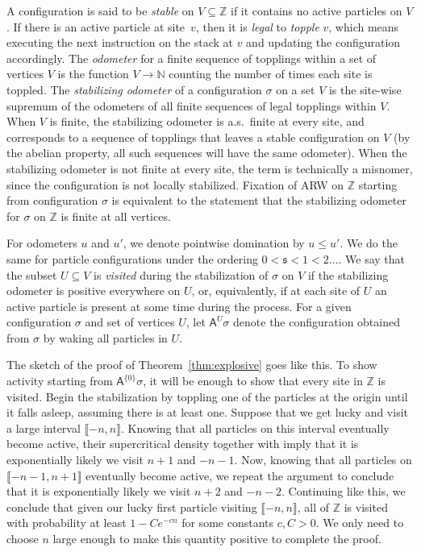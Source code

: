 \documentclass[ECP]{ejpecp} %
\begin{document}
A configuration is said to be \emph{stable} on
$V \subseteq \mathbb{Z}$ if it contains no active particles on $V$. If
there is an active particle at site~$v$, then it is \emph{legal} to
\emph{topple} $v$, which means executing the next instruction on the stack
at $v$ and updating the configuration accordingly. The
\emph{odometer} for a finite sequence of topplings within a set of vertices
$V$ is the function $V\to \mathbb{N}$ counting the number of times each
site is toppled. The \emph{stabilizing odometer} of a configuration
$\sigma $ on a set $V$ is the site-wise supremum of the odometers of all
finite sequences of legal topplings within $V$. When $V$ is finite, the
stabilizing odometer is a.s.\ finite at every site, and corresponds to
a sequence of topplings that leaves a stable configuration on $V$ (by the
abelian property, all such sequences will have the same odometer). When
the stabilizing odometer is not finite at every site, the term is technically
a misnomer, since the configuration is not locally stabilized. Fixation
of ARW on $\mathbb{Z}$ starting from configuration $\sigma $ is equivalent
to the statement that the stabilizing odometer for $\sigma $ on
$\mathbb{Z}$ is finite at all vertices.

For odometers $u$ and $u'$, we denote pointwise domination by
$u\leq u'$. We do the same for particle configurations under the ordering
$0 < \mathfrak{s}< 1 < 2 \ldots $. We say that the subset
$U \subseteq V$ is \emph{visited} during the stabilization of
$\sigma $ on $V$ if the stabilizing odometer is positive everywhere on
$U$, or, equivalently, if at each site of $U$ an active particle is present
at some time during the process. For a given configuration $\sigma $ and
set of vertices $U$, let $\mathsf{A}^{U}\sigma $ denote the configuration
obtained from $\sigma $ by waking all particles in $U$.

The sketch of the proof of Theorem~\ref{thm:explosive} goes like this.
To show activity starting from $\mathsf{A}^{\{0\}}\sigma $, it will be
enough to show that every site in $\mathbb{Z}$ is visited. Begin the stabilization
by toppling one of the particles at the origin until it falls asleep, assuming
there is at least one. Suppose that we get lucky and visit a large interval
$\mathopen{\llbracket }-n,n \mathclose{\rrbracket }$. Knowing that all particles on this interval eventually become
active, their supercritical density together with
\cite[Proposition~4.1]{cutoff} imply that it is exponentially likely we
visit $n+1$ and $-n-1$. Now, knowing that all particles on
$\mathopen{\llbracket }-n-1,n+1\mathclose{\rrbracket }$ eventually become active, we repeat the argument to conclude
that it is exponentially likely we visit $n+2$ and $-n-2$. Continuing like
this, we conclude that given our lucky first particle visiting
$\mathopen{\llbracket }-n,n \mathclose{\rrbracket }$, all of $\mathbb{Z}$ is visited with probability at least
$1-Ce^{-cn}$ for some constants $c,C>0$. We only need to choose $n$ large
enough to make this quantity positive to complete the proof.
\end{document}

